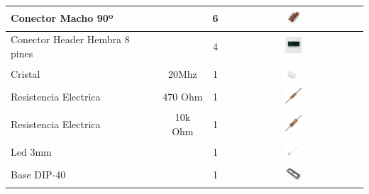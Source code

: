 \documentclass[a4paper,10pt]{book}
\begin{document}
\begin{center}
\begin{tabular}{| l | c | c |  c |}
      Conector Macho 90º		& 			& 6 			& \includegraphics[width=0.125\textwidth]{img/icsp.jpg} \\ \hline
      Conector Header Hembra 8 pines	& 			& 4 			& \includegraphics[width=0.125\textwidth]{img/header.png} \\ \hline
      Cristal				& 20Mhz			& 1 			& \includegraphics[width=0.125\textwidth]{img/cristal.jpg} \\ \hline
      Resistencia Electrica		& 470 Ohm		& 1 			& \includegraphics[width=0.125\textwidth]{img/470.jpg} \\ \hline
      Resistencia Electrica		& 10k  Ohm		& 1 			& \includegraphics[width=0.125\textwidth]{img/10K.jpg} \\ \hline
      Led 3mm				& 			& 1 			& \includegraphics[width=0.125\textwidth]{img/led.jpg} \\ \hline
      Base DIP-40 			& 			& 1 			& \includegraphics[width=0.125\textwidth]{img/DIP-40.jpg} \\ \hline
   \end{tabular}
 \end{center}
\end{document}
